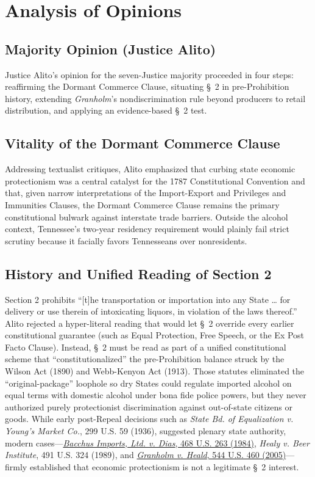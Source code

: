 \documentclass[12pt]{article}
\begin{document}
\section{Analysis of Opinions}
\subsection{Majority Opinion (Justice Alito)}

Justice Alito's opinion for the seven-Justice majority proceeded in four steps: reaffirming the Dormant Commerce Clause, situating \S~2 in pre-Prohibition history, extending \textit{Granholm}'s nondiscrimination rule beyond producers to retail distribution, and applying an evidence-based \S~2 test.

\subsection{Vitality of the Dormant Commerce Clause}
Addressing textualist critiques, Alito emphasized that curbing state economic protectionism was a central catalyst for the 1787 Constitutional Convention and that, given narrow interpretations of the Import-Export and Privileges and Immunities Clauses, the Dormant Commerce Clause remains the primary constitutional bulwark against interstate trade barriers. Outside the alcohol context, Tennessee's two-year residency requirement would plainly fail strict scrutiny because it facially favors Tennesseans over nonresidents.

\subsection{History and Unified Reading of Section 2}
Section 2 prohibits ``[t]he transportation or importation into any State \ldots{} for delivery or use therein of intoxicating liquors, in violation of the laws thereof.'' Alito rejected a hyper-literal reading that would let \S~2 override every earlier constitutional guarantee (such as Equal Protection, Free Speech, or the Ex Post Facto Clause). Instead, \S~2 must be read as part of a unified constitutional scheme that ``constitutionalized'' the pre-Prohibition balance struck by the Wilson Act (1890) and Webb-Kenyon Act (1913). Those statutes eliminated the ``original-package'' loophole so dry States could regulate imported alcohol on equal terms with domestic alcohol under bona fide police powers, but they never authorized purely protectionist discrimination against out-of-state citizens or goods. While early post-Repeal decisions such as \textit{State Bd. of Equalization v. Young's Market Co.}, 299 U.S. 59 (1936), suggested plenary state authority, modern cases---\href{https://supreme.justia.com/cases/federal/us/468/263/}{\textit{Bacchus Imports, Ltd. v. Dias}, 468 U.S. 263 (1984)}, \textit{Healy v. Beer Institute}, 491 U.S. 324 (1989), and \href{https://supreme.justia.com/cases/federal/us/544/460/}{\textit{Granholm v. Heald}, 544 U.S. 460 (2005)}---firmly established that economic protectionism is not a legitimate \S~2 interest.
\end{document}
